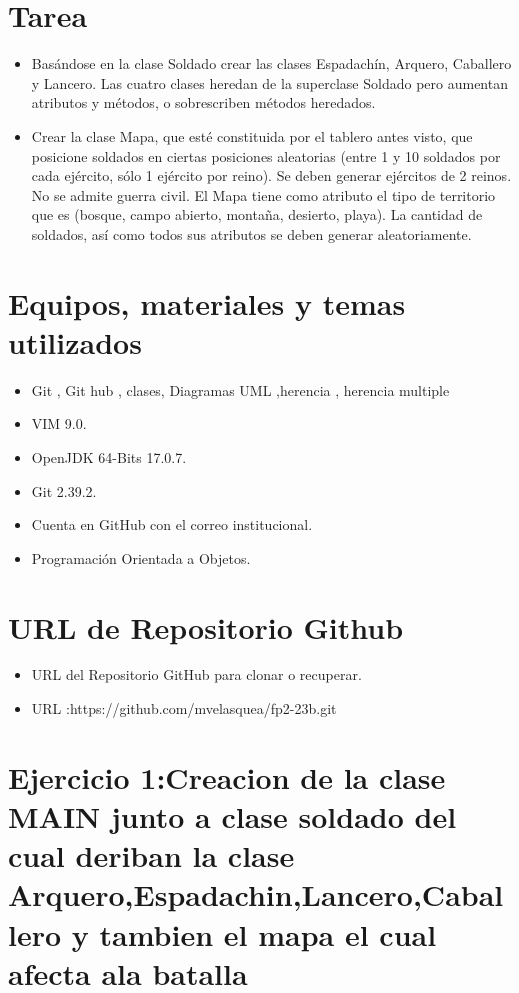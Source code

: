 \documentclass{article}
\begin{document}
	\section{Tarea}
	\begin{itemize}		
		\item Basándose en la clase Soldado crear las clases Espadachín, Arquero, Caballero
y Lancero. Las cuatro clases heredan de la superclase Soldado pero aumentan
atributos y métodos, o sobrescriben métodos heredados. 
		\item  Crear la clase Mapa, que esté constituida por el tablero antes visto, que
posicione soldados en ciertas posiciones aleatorias (entre 1 y 10 soldados por
cada ejército, sólo 1 ejército por reino). Se deben generar ejércitos de 2 reinos.
No se admite guerra civil. El Mapa tiene como atributo el tipo de territorio que
es (bosque, campo abierto, montaña, desierto, playa). La cantidad de soldados,
así como todos sus atributos se deben generar aleatoriamente.
		\end{itemize}
	\section{Equipos, materiales y temas utilizados}
	\begin{itemize}
		\item Git , Git hub , clases, Diagramas UML ,herencia , herencia multiple
		\item VIM 9.0.
		\item OpenJDK 64-Bits 17.0.7.
		\item Git 2.39.2.
		\item Cuenta en GitHub con el correo institucional.
		\item Programación Orientada a Objetos.
	\end{itemize}
	
	\section{URL de Repositorio Github}
	\begin{itemize}
		\item URL del Repositorio GitHub para clonar o recuperar.
			\item URL :https://github.com/mvelasquea/fp2-23b.git

	\end{itemize}
	
	\section{Ejercicio 1:Creacion de la clase MAIN junto a clase soldado del cual deriban  la clase Arquero,Espadachin,Lancero,Caballero  y tambien el mapa el cual afecta ala batalla}
	
\end{document}
